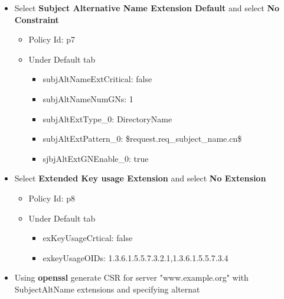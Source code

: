 \documentclass[a4paper]{article}
\begin{document}
\begin{enumerate}[label*=\arabic*.]
\begin{enumerate}[label*=\arabic*.]
\begin{itemize}
\begin{itemize}
                                    \item Select \textbf{Subject Alternative Name Extension Default} and select \textbf{No Constraint}
                                        \begin{itemize}
                                            \item Policy Id: p7
                                            \item Under Default tab
                                                \begin{itemize}
                                                    \item subjAltNameExtCritical: false
                                                    \item subjAltNameNumGNs: 1
                                                    \item subjAltExtType\_0:  DirectoryName
                                                    \item subjAltExtPattern\_0: \$request.req\_subject\_name.cn\$
                                                    \item sjbjAltExtGNEnable\_0: true
                                                \end{itemize}
                                        \end{itemize}
                                    \item Select \textbf{Extended Key usage Extension} and select \textbf{No Extension}
                                        \begin{itemize}
                                            \item Policy Id: p8
                                            \item Under Default tab
                                                \begin{itemize}
                                                    \item exKeyUsageCrtical: false
                                                    \item exkeyUsageOIDs: 1.3.6.1.5.5.7.3.2.1,1.3.6.1.5.5.7.3.4
                                                \end{itemize}
                                        \end{itemize}
                                    \item Using \textbf{openssl} generate CSR for server "www.example.org" with SubjectAltName extensions and specifying alternat

\end{itemize}
\end{itemize}
\end{enumerate}
\end{enumerate}
\end{document}

